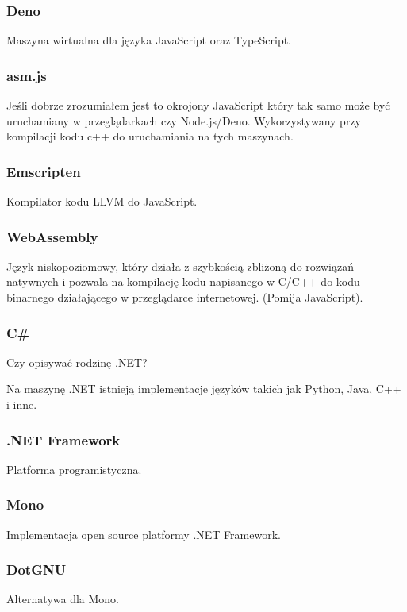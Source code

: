 \documentclass[a4paper]{article}
\begin{document}
\subsubsection{Deno}
Maszyna wirtualna dla języka JavaScript oraz TypeScript.

\subsubsection{asm.js}
Jeśli dobrze zrozumiałem jest to okrojony JavaScript który tak samo może być uruchamiany w przeglądarkach czy Node.js/Deno.
Wykorzystywany przy kompilacji kodu c++ do uruchamiania na tych maszynach.

\subsubsection{Emscripten}
Kompilator kodu LLVM do JavaScript.

\subsubsection{WebAssembly}
Język niskopoziomowy, który działa z szybkością zbliżoną do rozwiązań natywnych i pozwala na kompilację kodu napisanego w C/C++ do kodu binarnego działającego w przeglądarce internetowej.
(Pomija JavaScript).

\subsubsection{C\#}
Czy opisywać rodzinę .NET?

Na maszynę .NET istnieją implementacje języków takich jak Python, Java, C++ i inne.

\subsubsection{.NET Framework}
Platforma programistyczna.

\subsubsection{Mono}
Implementacja open source platformy .NET Framework.

\subsubsection{DotGNU}
Alternatywa dla Mono.
\end{document}
